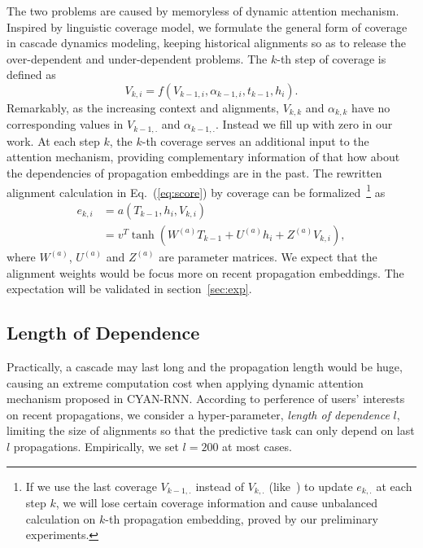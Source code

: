 The two problems are caused by memoryless of dynamic attention mechanism.
Inspired by linguistic coverage model, we formulate the general form of
coverage in cascade dynamics modeling, keeping historical alignments so as to
release the over-dependent and under-dependent problems. The $k$-th step of coverage is defined as
\begin{equation}
\label{eq:cov}
V_{k,i}=f\left(V_{k-1, i}, \alpha_{k-1,i}, t_{k-1}, h_i\right).
\end{equation}
Remarkably, as the increasing context and alignments, $V_{k,k}$ and
$\alpha_{k,k}$ have no corresponding values in $V_{k-1,.}$ and
$\alpha_{k-1,.}$. Instead we fill up with zero in our work. 
At each step $k$, the $k$-th coverage serves an additional input to the
attention mechanism, providing complementary information of that how about the
dependencies of propagation embeddings are in the past. The rewritten
alignment calculation in Eq.~(\ref{eq:score}) by coverage can be
formalized~\footnote{
If we use the last coverage $V_{k-1,.}$ instead of
$V_{k,.}$ (like~\cite{tu2016modeling}) to update $e_{k,.}$ at each step $k$, 
we will lose certain coverage information and cause unbalanced
calculation on $k$-th propagation embedding, proved by our preliminary
experiments.} as
\begin{equation}
\label{eq:att_cov}
\begin{aligned}
e_{k,i} &= a(T_{k-1}, h_i, V_{k,i}) \\
& = v^T\tanh(W^{(a)} T_{k-1}+U^{(a)} h_i+Z^{(a)} V_{k,i}),
\end{aligned}
\end{equation}
where $W^{(a)}$, $U^{(a)}$ and $Z^{(a)}$ are parameter matrices. We expect that
the alignment weights would be focus more on recent propagation embeddings. The
expectation will be validated in section~\ref{sec:exp}.

\subsection{Length of Dependence}
Practically, a cascade may last long and the propagation length would be huge,
causing an extreme computation cost when applying dynamic attention mechanism
proposed in CYAN-RNN. According to perference of users' interests on recent
propagations, we consider a hyper-parameter, \emph{length of dependence}
$l$, limiting the size of alignments so that the predictive task can only
depend on last $l$ propagations. Empirically, we set $l=200$ at most cases.

